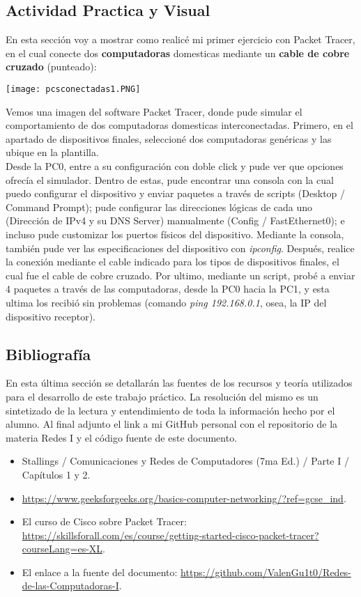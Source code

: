 \documentclass{article}
\begin{document}
\newpage

\subsection{Actividad Practica y Visual }
En esta sección voy a mostrar como realicé mi primer ejercicio con Packet Tracer, en el cual conecte dos \textbf{computadoras} domesticas mediante un \textbf{cable de cobre cruzado} (punteado):

\texttt{[image: pcsconectadas1.PNG]}

{\setlength{\parindent}{1pt} Vemos una imagen del software Packet Tracer, donde pude simular el comportamiento de dos computadoras domesticas interconectadas. Primero, en el apartado de dispositivos finales, seleccioné dos computadoras genéricas y las ubique en la plantilla. \\ 

Desde la PC0, entre a su configuración con doble click y pude ver que opciones ofrecía el simulador. Dentro de estas, pude encontrar una consola con la cual puedo configurar el dispositivo y enviar paquetes a través de scripts (Desktop / Command Prompt); pude configurar las direcciones lógicas de cada uno  (Dirección de IPv4 y su DNS Server) manualmente (Config / FastEthernet0); e incluso pude customizar los puertos físicos del dispositivo. 
Mediante la consola, también pude ver las especificaciones del dispositivo con \textit{ipconfig}. Después, realice la conexión mediante el cable indicado para los tipos de dispositivos finales, el cual fue el cable de cobre cruzado. Por ultimo, mediante un script, probé a enviar 4 paquetes a través de las computadoras, desde la PC0 hacia la PC1, y esta ultima los recibió sin problemas (comando \textit{ping 192.168.0.1}, osea, la IP del dispositivo receptor). }


\subsection{Bibliografía}
En esta última sección se detallarán las fuentes de los recursos y teoría utilizados para el desarrollo de este trabajo práctico. La resolución del mismo es un sintetizado de la lectura y entendimiento de toda la información hecho por el alumno. Al final adjunto el link a mi GitHub personal con el repositorio de la materia Redes I y el código fuente de este documento.
\begin{itemize}
    \item Stallings / Comunicaciones y Redes de Computadores (7ma Ed.) / Parte I / Capítulos 1 y 2.
    \item \url{https://www.geeksforgeeks.org/basics-computer-networking/?ref=gcse_ind}.
    \item El curso de Cisco sobre Packet Tracer: 
    \url{ https://skillsforall.com/es/course/getting-started-cisco-packet-tracer?courseLang=es-XL}.
    \item El enlace a la fuente del documento: \url{https://github.com/ValenGu1t0/Redes-de-las-Computadoras-I}.
\end{itemize}
\end{document}
